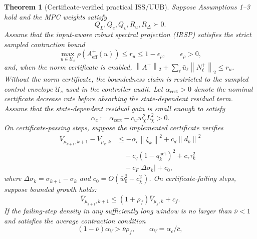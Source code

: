 \documentclass[letterpaper,journal]{IEEEtran}
\newcommand{\norm}[1]{\left\lVert #1 \right\rVert}
\newtheorem{theorem}{Theorem}
\begin{document}
\begin{theorem}[Certificate-verified practical ISS/UUB]
\label{thm:practical_iss_uub}
Suppose Assumptions 1--3 hold and the MPC weights satisfy
\begin{equation}
Q_L,Q_e,Q_v,R_u,R_\Delta\succ0 .
\label{eq:positive_weights}
\end{equation}
Assume that the input-aware robust spectral projection (IRSP) satisfies the strict sampled contraction bound
\begin{equation}
\max_{u\in\mathcal U_s}\rho(A_{\mathrm{eff}}^+(u))\le r_u\le 1-\epsilon_\rho,\qquad \epsilon_\rho>0,
\label{eq:irsp_strict_contraction}
\end{equation}
and, when the norm certificate is enabled,
$\norm{A^+}_2+\sum_\ell \bar u_\ell\norm{N_\ell^+}_2\le r_u$. Without the norm certificate, the boundedness claim is restricted to the sampled control envelope $\mathcal U_s$ used in the controller audit. Let $\alpha_{\mathrm{cert}}>0$ denote the nominal certificate decrease rate before absorbing the state-dependent residual term. Assume that the state-dependent residual gain is small enough to satisfy
\begin{equation}
\alpha_c:=\alpha_{\mathrm{cert}}-c_w\bar w_\chi^2L_\chi^2>0 .
\label{eq:residual_small_gain}
\end{equation}
On certificate-passing steps, suppose the implemented certificate verifies
\begingroup\small
\begin{equation}
\begin{aligned}
\bar V_{\mu_{k+1},k+1}-\bar V_{\mu_k,k}
&\le -\alpha_c\norm{\xi_k}^2+c_d\norm{d_k}^2\\
&\quad +c_q(1-q_k^{\mathrm{net}})^2
+c_\tau\tau_k^2\\
&\quad +c_F|\Delta\sigma_k|+c_0 ,
\end{aligned}
\label{eq:iss_difference}
\end{equation}
\endgroup
where $\Delta\sigma_k=\sigma_{k+1}-\sigma_k$ and $c_0=O(\bar w_0^2+c_\chi^2)$. On certificate-failing steps, suppose bounded growth holds:
\begin{equation}
\bar V_{\mu_{k+1},k+1}\le (1+\rho_f)\bar V_{\mu_k,k}+c_f .
\label{eq:failure_growth_bound}
\end{equation}
If the failing-step density in any sufficiently long window is no larger than $\bar\nu<1$ and satisfies the average contraction condition
\begin{equation}
(1-\bar\nu)\alpha_V>\bar\nu\rho_f,
\qquad
\alpha_V=\alpha_c/\bar c ,
\label{eq:average_contraction_condition}

\end{equation}
\end{theorem}
\end{document}
